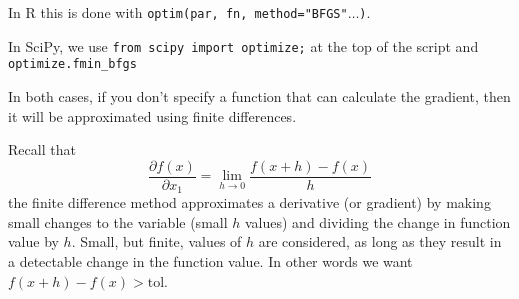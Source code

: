 \documentclass[11pt]{article}
\begin{document}
In R this is done with {\tt optim(par, fn, method="BFGS"$\ldots$)}.

In SciPy, we use {\tt from scipy import optimize;} at the top of the script and {\tt optimize.fmin\_bfgs}

In both cases, if you don't specify a function that can calculate the gradient, then it will be approximated using finite differences.

Recall that 
$$\frac{\partial f(x)}{\partial x_1} = \lim_{h \rightarrow 0}\frac{f(x+h)-f(x)}{h}$$
the finite difference method approximates a derivative (or gradient) by making small changes to the variable (small $h$ values) and dividing the change in function value by $h$.
Small, but finite, values of $h$ are considered, as long as they result in a detectable change in the function value. 
In other words we want $f(x+h)-f(x) > \mbox{tol}$.
%
\end{document}
